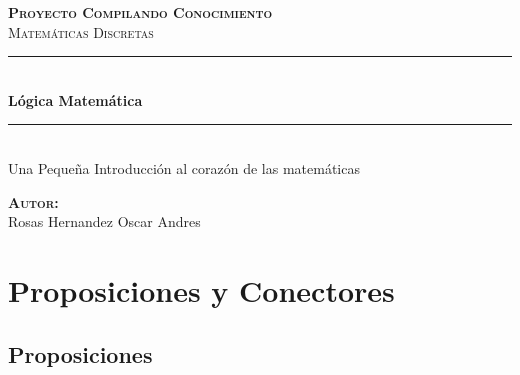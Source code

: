 \documentclass[12pt]{report}                                    %
\author{Oscar Andrés Rosas}                                     %
\begin{document}
\begin{titlepage}

	\center
	\textbf{\textsc{\Large Proyecto Compilando Conocimiento}}\\[1.0cm] 
	\textsc{\Large Matemáticas Discretas}\\[1.0cm] 

	\rule{\linewidth}{0.5mm} \\[1.0cm]
		{ \huge \bfseries Lógica Matemática}\\[1.0cm] 
	\rule{\linewidth}{0.5mm} \\[2.0cm]
	
	{\LARGE Una Pequeña Introducción al corazón de las matemáticas}\\[7cm] 
	
	\begin{center} \large
	\textbf{\textsc{Autor:}}\\
	Rosas Hernandez Oscar Andres
	\end{center}

	\vfill

\end{titlepage}

\tableofcontents{}
\label{sec:Index}

\clearpage










\chapter{Proposiciones y Conectores}
    \clearpage

    \section{Proposiciones}
\end{document}
